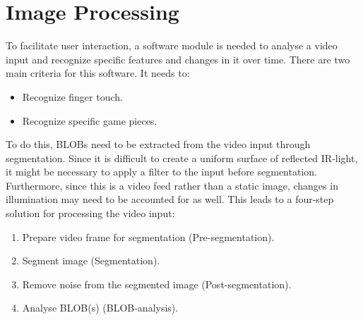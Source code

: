 \section{Image Processing}
To facilitate user interaction, a software module is needed to analyse a video input and recognize specific features and changes in it over time. There are two main criteria for this software. It needs to:
\begin{itemize}
\item Recognize finger touch.
\item Recognize specific game pieces.
\end{itemize}

To do this, BLOBs need to be extracted from the video input through segmentation. Since it is difficult to create a uniform surface of reflected IR-light, it might be necessary to apply a filter to the input before segmentation. Furthermore, since this is a video feed rather than a static image, changes in illumination may need to be accounted for as well. This leads to a four-step solution for processing the video input:
\begin{enumerate}
\item Prepare video frame for segmentation (Pre-segmentation).
\item Segment image (Segmentation).
\item Remove noise from the segmented image (Post-segmentation).
\item Analyse BLOB(s) (BLOB-analysis).
\end{enumerate}

